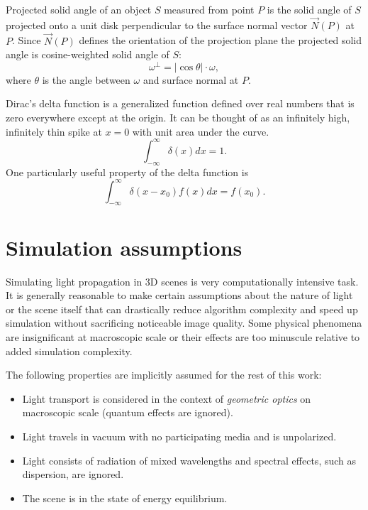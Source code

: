 \begin{df}
Projected solid angle \parencite{nicodemus76} of an object $S$ measured from point $P$ is the solid angle of $S$ projected onto a unit disk perpendicular to the surface normal vector $\vec{N}(P)$ at $P$. Since $\vec{N}(P)$ defines the orientation of the projection plane the projected solid angle is cosine-weighted solid angle of $S$:
\begin{equation}
  \omega^{\perp} = |\cos\theta| \cdot \omega ,
\end{equation}
where $\theta$ is the angle between $\omega$ and surface normal at $P$. 
\end{df}

\begin{df}
  Dirac's delta function \parencite{dirac58} is a generalized function defined over real numbers that is zero everywhere except at the origin. It can be thought of as an infinitely high, infinitely thin spike at $x=0$ with unit area under the curve.
\begin{equation}
  \int_{-\infty}^{\infty} \delta(x) dx = 1.
\end{equation}
One particularly useful property of the delta function is
\begin{equation}
  \int_{-\infty}^{\infty} \delta(x - x_{0}) f(x) dx = f(x_{0}).
\end{equation}
\end{df}

\section{Simulation assumptions}
\label{sec:assumptions}
Simulating light propagation in 3D scenes is very computationally intensive task. It is generally reasonable to make certain assumptions about the nature of light or the scene itself that can drastically reduce algorithm complexity and speed up simulation without sacrificing noticeable image quality. Some physical phenomena are insignificant at macroscopic scale or their effects are too minuscule relative to added simulation complexity.

The following properties are implicitly assumed for the rest of this work:
\begin{itemize}
\item Light transport is considered in the context of \emph{geometric optics} on macroscopic scale (quantum effects are ignored).
\item Light travels in vacuum with no participating media and is unpolarized.
\item Light consists of radiation of mixed wavelengths and spectral effects, such as dispersion, are ignored.
\item The scene is in the state of energy equilibrium. 
\end{itemize}

